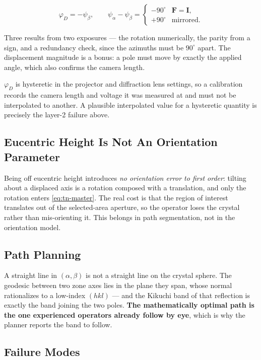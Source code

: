 \begin{equation}
\varphi_D = -\psi_\beta,
\qquad
\psi_\alpha - \psi_\beta =
\begin{cases}
-90^{\circ} & \mathbf{F} = \mathbf{I},\\
+90^{\circ} & \text{mirrored}.
\end{cases}
\label{eq:tn-calibration}
\end{equation}

Three results from two exposures --- the rotation numerically, the parity from a sign, and a
redundancy check, since the azimuths must be $90^{\circ}$ apart. The displacement magnitude is a
bonus: a pole must move by exactly the applied angle, which also confirms the camera length.

$\varphi_D$ is hysteretic in the projector and diffraction lens settings, so a calibration records
the camera length and voltage it was measured at and must not be interpolated to another. A
plausible interpolated value for a hysteretic quantity is precisely the layer-2 failure above.

\subsection{Eucentric Height Is Not An Orientation Parameter}

Being off eucentric height introduces \emph{no orientation error to first order}: tilting about a
displaced axis is a rotation composed with a translation, and only the rotation enters
\eqref{eq:tn-master}. The real cost is that the region of interest translates out of the
selected-area aperture, so the operator loses the crystal rather than mis-orienting it. This
belongs in path segmentation, not in the orientation model.

\subsection{Path Planning}

A straight line in $(\alpha,\beta)$ is not a straight line on the crystal sphere. The geodesic
between two zone axes lies in the plane they span, whose normal rationalizes to a low-index
$(hkl)$ --- and the Kikuchi band of that reflection is exactly the band joining the two poles.
\textbf{The mathematically optimal path is the one experienced operators already follow by eye},
which is why the planner reports the band to follow.

\subsection{Failure Modes}


